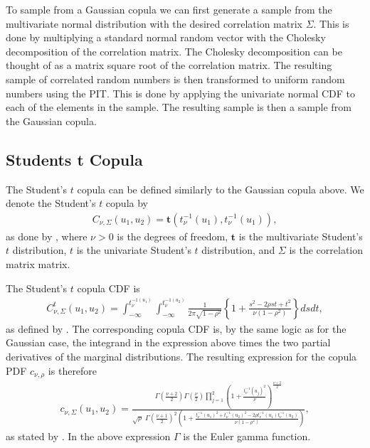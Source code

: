 \documentclass[%
a4paper,							
11pt,								
bibliography=totoc,						
abstracton=true					
]
{scrartcl}
\theoremstyle{plain}
\theoremstyle{definition}
\theoremstyle{remark}
\newcommand{\1}{\mathbbm{1}}
\begin{document}
To sample from a Gaussian copula we can first generate a sample from the multivariate normal distribution with the desired correlation matrix $\Sigma$. This is done by multiplying a standard normal random vector with the Cholesky decomposition of the correlation matrix. The Cholesky decomposition can be thought of as a matrix square root of the correlation matrix. The resulting sample of correlated random numbers is then transformed to uniform random numbers using the \gls{PIT}. This is done by applying the univariate normal \gls{CDF} to each of the elements in the sample. The resulting sample is then a sample from the Gaussian copula\footnotemark[\value{footnote}]. %



\subsection{Students t Copula}\label{sec:StudentsCopula} 
The Student's $t$ copula can be defined similarly to the Gaussian copula above. We denote the Student's $t$ copula by 
\begin{align*}
    C_{\nu,\Sigma}(u_1,u_2) = \boldsymbol{t}(t_\nu^{-1}(u_1),t_\nu^{-1}(u_1)),
\end{align*}
as done by , where $\nu >0$ is the degrees of freedom, $\boldsymbol{t}$ is the multivariate Student's $t$ distribution, $t$ is the univariate Student's $t$ distribution, and $\Sigma$ is the correlation matrix matrix.

The Student's $t$ copula \gls{CDF} is 
\begin{align*}
     C_{\nu,\Sigma}^t (u_1,u_2)
    = \int_{-\infty}^{t_\nu^{-1(u_1)}}\int_{-\infty}^{t_\nu^{-1(u_2)}}
    \frac{1}{2\pi\sqrt{1-\rho^2}} \left\{  1+ \frac{s^2-2\rho st+t^2}{\nu(1-\rho^2)}   \right\} dsdt,
\end{align*}
as defined by \citet[p.~116]{Umberto2004copulaMethods}. The corresponding copula \gls{CDF} is, by the same logic as for the Gaussian case, the integrand in the expression above times the two partial derivatives of the marginal distributions. The resulting expression for the copula \gls{PDF} $c_{\nu,\rho}$ is therefore 
\begin{align*}
    c_{\nu,\Sigma}(u_1,u_2) = \frac{\Gamma(\frac{\nu+2}{2})\Gamma(\frac{\nu}{2})\prod_{j=1}^2\left( 1+ \frac{t_\nu^{-1}(u_j)^2}{\nu}\right)^{\frac{\nu+2}{2}} } {\sqrt{\rho} \;\Gamma(\frac{\nu+1}{2})^{2}\left( 1+ \frac{t_\nu^{-1}(u_1)^2 + t_\nu^{-1}(u_2)^2 -2\rho t_\nu^{-1}(u_1) t_\nu^{-1}(u_2) }{\nu(1-\rho^2)}\right)},
\end{align*}
as stated by . In the above expression $\Gamma$ is the Euler gamma function.
\end{document}
